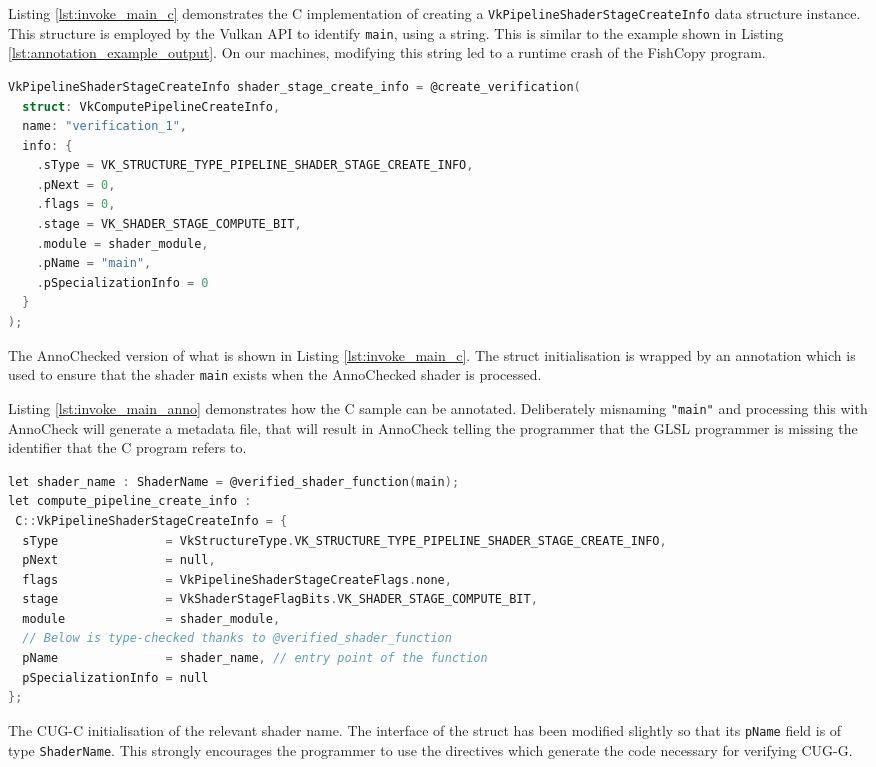 \documentclass[a4paper,12pt,twoside,openright]{report}
\begin{document}
Listing \ref{lst:invoke_main_c} demonstrates the C implementation of creating a
\texttt{VkPipelineShaderStageCreateInfo} data structure instance. This
structure is employed by the Vulkan API to identify \texttt{main}, using a
string. This is similar to the example shown in Listing
\ref{lst:annotation_example_output}. On our machines, modifying this string led
to a runtime crash of the FishCopy program.

\begin{lstfloat}
\begin{lstlisting}[language=C]
VkPipelineShaderStageCreateInfo shader_stage_create_info = @create_verification(
  struct: VkComputePipelineCreateInfo,
  name: "verification_1",
  info: {
    .sType = VK_STRUCTURE_TYPE_PIPELINE_SHADER_STAGE_CREATE_INFO,
    .pNext = 0,
    .flags = 0,
    .stage = VK_SHADER_STAGE_COMPUTE_BIT,
    .module = shader_module,
    .pName = "main",
    .pSpecializationInfo = 0
  }
);
\end{lstlisting}
\caption{The AnnoChecked version of what is shown in Listing
\ref{lst:invoke_main_c}. The struct initialisation is wrapped by an annotation
which is used to ensure that the shader \texttt{main} exists when the
AnnoChecked shader is processed.}
\label{lst:invoke_main_anno}
\end{lstfloat}

Listing \ref{lst:invoke_main_anno} demonstrates how the C sample can be
annotated. Deliberately misnaming \texttt{"main"} and processing this with
AnnoCheck will generate a metadata file, that will result in AnnoCheck telling
the programmer that the GLSL programmer is missing the identifier that the C
program refers to.

\begin{lstfloat}
\begin{lstlisting}[language=C]
let shader_name : ShaderName = @verified_shader_function(main);
let compute_pipeline_create_info :
 C::VkPipelineShaderStageCreateInfo = {
  sType               = VkStructureType.VK_STRUCTURE_TYPE_PIPELINE_SHADER_STAGE_CREATE_INFO,
  pNext               = null,
  flags               = VkPipelineShaderStageCreateFlags.none,
  stage               = VkShaderStageFlagBits.VK_SHADER_STAGE_COMPUTE_BIT,
  module              = shader_module,
  // Below is type-checked thanks to @verified_shader_function
  pName               = shader_name, // entry point of the function
  pSpecializationInfo = null
};
\end{lstlisting}
\caption{The CUG-C initialisation of the relevant shader name. The interface of
the struct has been modified slightly so that its \texttt{pName} field is of
type \texttt{ShaderName}. This strongly encourages the programmer to use the
directives which generate the code necessary for verifying CUG-G.}
\label{lst:invoke_main_cugc}
\end{lstfloat}
\end{document}
